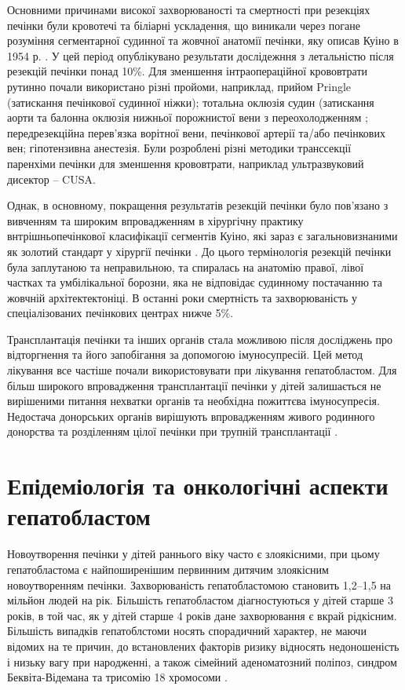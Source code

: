 Основними причинами високої захворюваності та смертності при резекціях печінки були кровотечі та біліарні ускладення, що виникали через погане розуміння сегментарної судинної та жовчної анатомії печінки, яку описав Куіно в 1954 р. \cite{pmid12778356}. У цей період опублікувано результати дослідежння з летальністю після резекцій печінки понад 10\%. Для зменшення інтраопераційної крововтрати рутинно почали використано різні пройоми, наприклад, прийом Pringle \cite{pmid15285242} (затискання печінкової судинної ніжки); тотальна оклюзія судин (затискання аорти та балонна оклюзія нижньої порожнистої вени з  переохолодженням \cite{pmid1328586}; передрезекційна перев'язка ворітної вени, печінкової артерії та/або печінкових вен; гіпотензивна анестезія. Були розроблені різні методики транссекції паренхіми печінки для зменшення крововтрати, наприклад ультразвуковий дисектор – CUSA. 

Однак, в основному, покращення результатів резекцій печінки було пов’язано з вивченням та широким впровадженням в хірургічну практику внтрішньопечінкової класифікації сегментів Куіно, які зараз є загальновизнаними як золотий стандарт у хірургії печінки \cite{pmid12778356}. До цього термінологія резекцій печінки була заплутаною та неправильною, та спиралась на анатомію правої, лівої частках та умбілікальної борозни, яка не відповідає судинному постачанню та жовчній архітектектоніці.
В останні роки смертність та захворюваність у спеціалізованих печінкових центрах нижче 5\%. 

Трансплантація печінки та інших органів стала можливою після досліджень про відторгнення та його запобігання за допомогою імуносупресій. Цей метод лікування все частіше почали використовувати при лікування гепатобластом. Для більш широкого впровадження трансплантації печінки у дітей залишається не вирішеними питання нехватки органів та необхідна пожиттєва імуносупресія. Недостача донорських органів вирішують впровадженням живого родинного донорства та розділенням цілої печінки при трупній трансплантації \cite{pmid14746860}. 

\section{Епідеміологія та онкологічні аспекти гепатобластом}
Новоутворення печінки у дітей раннього віку часто є злоякісними, при цьому гепатобластома є найпоширенішим первинним дитячим злоякісним новоутворенням  печінки. Захворюваність гепатобластомою становить 1,2–1,5 на мільйон людей на рік. Більшість гепатобластом  діагностуються у дітей старше 3 років, в той час, як у дітей старше  4 років дане захворювання є вкрай рідкісним. Більшість випадків гепатоблстоми носять спорадичний характер, не маючи відомих на те причин, до встановлених факторів ризику відносять недоношеність і низьку вагу при народженні, а також сімейний аденоматозний поліпоз, синдром Беквіта-Відемана та трисомію 18 хромосоми \cite{pmid15285242}. 

